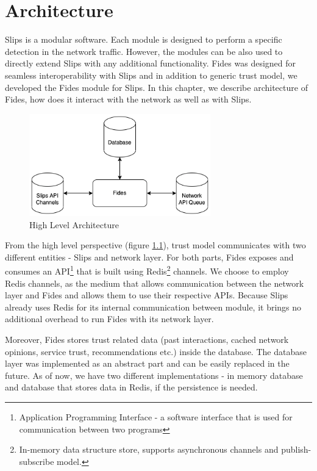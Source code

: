 \chapter{Architecture}
\label{ch:architecture}
Slips is a modular software. Each module is designed to perform a specific detection in the network traffic.\cite{slips}
However, the modules can be also used to directly extend Slips with any additional functionality. 
Fides was designed for seamless interoperability with Slips and in addition to generic trust model, we developed the Fides module for Slips.
In this chapter, we describe architecture of Fides, how does it interact with the network as well as with Slips.

\begin{figure}[ht]
    \centering
    \includegraphics[width=0.7\textwidth]{assets/high_architecture.png}
    \caption{High Level Architecture}
    \label{fig:high-level-architecture}
\end{figure}

From the high level perspective (figure \ref{fig:high-level-architecture}), trust model communicates with two different entities - Slips and network layer.
For both parts, Fides exposes and consumes an API\footnote{Application Programming Interface - a software interface that is used for communication between two programs} that is built using Redis\footnote{In-memory data structure store, supports asynchronous channels and publish-subscribe model.} channels.
We choose to employ Redis channels, as the medium that allows communication between the network layer and Fides and allows them to use their respective APIs.
Because Slips already uses Redis for its internal communication between module, it brings no additional overhead to run Fides with its network layer.

Moreover, Fides stores trust related data (past interactions, cached network opinions, service trust, recommendations etc.) inside the database.
The database layer was implemented as an abstract part and can be easily replaced in the future.
As of now, we have two different implementations - in memory database and database that stores data in Redis, if the persistence is needed.

